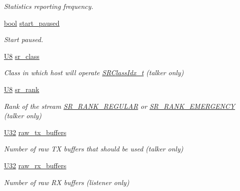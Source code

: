 \begin{DoxyCompactItemize}
\begin{DoxyCompactList}\small\item\em Statistics reporting frequency. \end{DoxyCompactList}\item 
\hyperlink{avb__gptp_8h_af6a258d8f3ee5206d682d799316314b1}{bool} \hyperlink{structopenavb__tl__data__cfg_a0983af523b1f3fd4392c902ccf862905}{start\+\_\+paused}
\begin{DoxyCompactList}\small\item\em Start paused. \end{DoxyCompactList}\item 
\hyperlink{openavb__types__base__pub_8h_aa63ef7b996d5487ce35a5a66601f3e73}{U8} \hyperlink{structopenavb__tl__data__cfg_a39d4e73b306d801de38536c43ef7a5e8}{sr\+\_\+class}
\begin{DoxyCompactList}\small\item\em Class in which host will operate \hyperlink{openavb__types__base__pub_8h_a4d8ccbeaf8ad040d8880e8971fc62752}{S\+R\+Class\+Idx\+\_\+t} (talker only) \end{DoxyCompactList}\item 
\hyperlink{openavb__types__base__pub_8h_aa63ef7b996d5487ce35a5a66601f3e73}{U8} \hyperlink{structopenavb__tl__data__cfg_aec168f739a62e7d1167959b587d0a50b}{sr\+\_\+rank}
\begin{DoxyCompactList}\small\item\em Rank of the stream \hyperlink{openavb__types__base__pub_8h_ae2247245210ff7d9b305530e79921b04}{S\+R\+\_\+\+R\+A\+N\+K\+\_\+\+R\+E\+G\+U\+L\+AR} or \hyperlink{openavb__types__base__pub_8h_afc788727fb40393561024641cee8f6c8}{S\+R\+\_\+\+R\+A\+N\+K\+\_\+\+E\+M\+E\+R\+G\+E\+N\+CY} (talker only) \end{DoxyCompactList}\item 
\hyperlink{openavb__types__base__pub_8h_a696390429f2f3b644bde8d0322a24124}{U32} \hyperlink{structopenavb__tl__data__cfg_add91cb46547dd8e10a83b4807314b515}{raw\+\_\+tx\+\_\+buffers}
\begin{DoxyCompactList}\small\item\em Number of raw TX buffers that should be used (talker only) \end{DoxyCompactList}\item 
\hyperlink{openavb__types__base__pub_8h_a696390429f2f3b644bde8d0322a24124}{U32} \hyperlink{structopenavb__tl__data__cfg_a878cfe34b25df40f0858bff76cbfd4e6}{raw\+\_\+rx\+\_\+buffers}
\begin{DoxyCompactList}\small\item\em Number of raw RX buffers (listener only) \end{DoxyCompactList}\item 

\end{DoxyCompactItemize}
